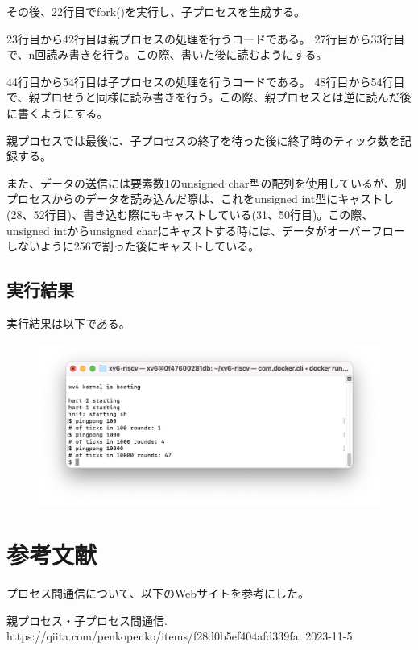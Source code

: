 \documentclass[11pt,a4paper]{jsarticle}
\begin{document}
その後、22行目でfork()を実行し、子プロセスを生成する。

23行目から42行目は親プロセスの処理を行うコードである。
27行目から33行目で、n回読み書きを行う。この際、書いた後に読むようにする。

44行目から54行目は子プロセスの処理を行うコードである。
48行目から54行目で、親プロせうと同様に読み書きを行う。この際、親プロセスとは逆に読んだ後に書くようにする。

親プロセスでは最後に、子プロセスの終了を待った後に終了時のティック数を記録する。

また、データの送信には要素数1のunsigned char型の配列を使用しているが、別プロセスからのデータを読み込んだ際は、これをunsigned int型にキャストし(28、52行目)、書き込む際にもキャストしている(31、50行目)。この際、unsigned intからunsigned charにキャストする時には、データがオーバーフローしないように256で割った後にキャストしている。


\subsection{実行結果}
実行結果は以下である。

\begin{figure}[H]
\includegraphics[width=0.8\linewidth]{image/figure1.png}
\end{figure}


\section{参考文献}
プロセス間通信について、以下のWebサイトを参考にした。

親プロセス・子プロセス間通信. https://qiita.com/penkopenko/items/f28d0b5ef404afd339fa. 2023-11-5
%
%
\end{document}

